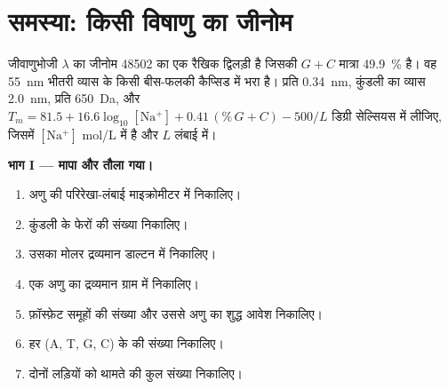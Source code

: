 \section{समस्या: किसी विषाणु का जीनोम}

\begin{problem}
\label{pb:b1:nucleic-acids:1}
जीवाणुभोजी $\lambda$ का जीनोम \num{48502}  का एक रैखिक
द्विलड़ी  है जिसकी $G + C$ मात्रा \qty{49.9}{\%} है। वह
\qty{55}{nm} भीतरी व्यास के किसी बीस-फलकी कैप्सिड में भरा है।
प्रति  \qty{0.34}{nm}, कुंडली का व्यास \qty{2.0}{nm},
प्रति  \qty{650}{Da}, और $T_m = 81.5 + 16.6\log_{10}[\mathrm{Na^+}]
+ 0.41\,(\%\,G{+}C) - 500/L$ डिग्री सेल्सियस में लीजिए, जिसमें
$[\mathrm{Na^+}]$ \unit{mol/L} में है और $L$ लंबाई  में।

\medskip
\noindent\textbf{भाग I --- मापा और तौला गया।}
\begin{enumerate}
  \item अणु की परिरेखा-लंबाई माइक्रोमीटर में निकालिए।
  \item कुंडली के फेरों की संख्या निकालिए।
  \item उसका मोलर द्रव्यमान डाल्टन में निकालिए।
  \item एक अणु का द्रव्यमान ग्राम में निकालिए।
  \item फ़ॉस्फ़ेट समूहों की संख्या और उससे अणु का शुद्ध आवेश निकालिए।
  \item हर  (A, T, G, C) के  की संख्या निकालिए।
  \item दोनों लड़ियों को थामते  की कुल संख्या निकालिए।
\end{enumerate}


\end{problem}
